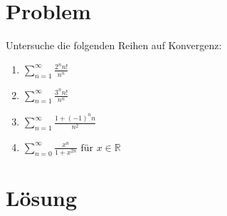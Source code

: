 \documentclass{article}
\begin{document}
\section*{Problem}

Untersuche die folgenden Reihen auf Konvergenz:

\begin{enumerate}[label=(\alph*)]

\item $\displaystyle \sum_{n=1}^\infty \frac{2^n n!}{n^n}$

\item $\displaystyle \sum_{n=1}^\infty \frac{3^n n!}{n^n}$

\item $\displaystyle \sum_{n=1}^\infty \frac{1 + (-1)^n n}{n^2}$

\item $\displaystyle \sum_{n=0}^\infty \frac{x^n}{1+x^{2n}} \text{ für } x \in \mathbb{R}$

\end{enumerate}

\section*{Lösung}
\end{document}
